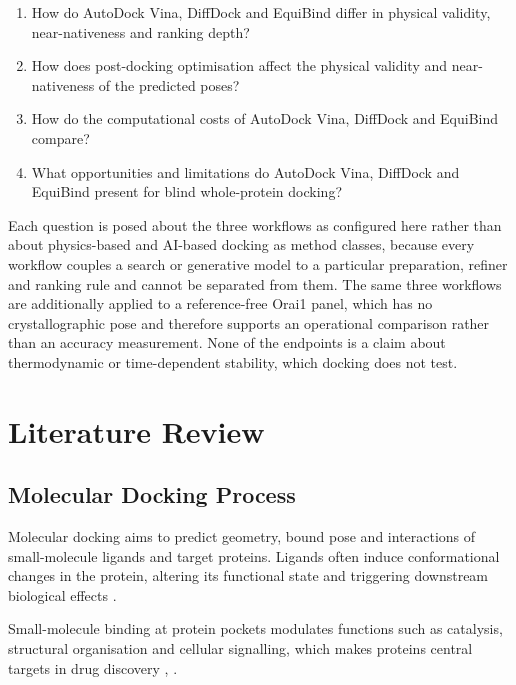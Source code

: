 \begin{enumerate}
\item[\textbf{RQ1}] How do AutoDock Vina, DiffDock and EquiBind differ in physical validity, near-nativeness and ranking depth?
\item[\textbf{RQ2}] How does post-docking optimisation affect the physical validity and near-nativeness of the predicted poses?
\item[\textbf{RQ3}] How do the computational costs of AutoDock Vina, DiffDock and EquiBind compare?
\item[\textbf{RQ4}] What opportunities and limitations do AutoDock Vina, DiffDock and EquiBind present for blind whole-protein docking?
\end{enumerate}

Each question is posed about the three workflows as configured here rather than about physics-based and AI-based docking as method classes, because every workflow couples a search or generative model to a particular preparation, refiner and ranking rule and cannot be separated from them. The same three workflows are additionally applied to a reference-free Orai1 panel, which has no crystallographic pose and therefore supports an operational comparison rather than an accuracy measurement. None of the endpoints is a claim about thermodynamic or time-dependent stability, which docking does not test.

\hypertarget{literature-review}{%
\chapter{\texorpdfstring{Literature Review }{Literature Review }}\label{literature-review}}

\hypertarget{molecular-docking-process}{%
\section{Molecular Docking Process}\label{molecular-docking-process}}

Molecular docking aims to predict geometry, bound pose and interactions of small-molecule ligands and target proteins. Ligands often induce conformational changes in the protein, altering its functional state and triggering downstream biological effects \cite{ref016}.

Small-molecule binding at protein pockets modulates functions such as catalysis, structural organisation and cellular signalling, which makes proteins central targets in drug discovery \cite{ref014}, \cite{ref015}.

